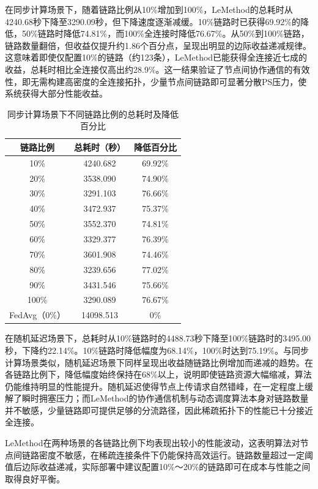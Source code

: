 \documentclass[master, vlined]{DissertUESTC}
\begin{document}
	在同步计算场景下，随着链路比例从10\%增加到100\%，LeMethod的总耗时从4240.68秒下降至3290.09秒，但下降速度逐渐减缓。10\%链路时已获得69.92\%的降低，50\%链路时降低74.81\%，而100\%全连接时降低76.67\%。从50\%到100\%链路，链路数量翻倍，但收益仅提升约1.86个百分点，呈现出明显的边际收益递减规律。这意味着即使仅配置10\%的链路（约123条），LeMethod已能获得全连接近七成的收益，总耗时相比全连接仅高出约28.9\%。这一结果验证了节点间协作通信的有效性，即无需构建高密度的全连接拓扑，少量节点间链路即可显著分散PS压力，使系统获得大部分性能收益。

	\begin{table}[!htb]
		\centering
		\caption{同步计算场景下不同链路比例的总耗时及降低百分比}
		\label{tab:sparse_sync}
		\begin{tabular}{|c|c|c|}
			\hline
			\textbf{链路比例} & \textbf{总耗时（秒）} & \textbf{降低百分比} \\
			\hline
			10\%  & 4240.682 & 69.92\% \\
			20\%  & 3538.090 & 74.90\% \\
			30\%  & 3291.103 & 76.66\% \\
			40\%  & 3472.937 & 75.37\% \\
			50\%  & 3552.370 & 74.81\% \\
			60\%  & 3329.377 & 76.39\% \\
			70\%  & 3601.908 & 74.46\% \\
			80\%  & 3239.656 & 77.02\% \\
			90\%  & 3431.546 & 75.66\% \\
			100\% & 3290.089 & 76.67\% \\
			\hline
			FedAvg（0\%）& 14098.513 & 0\% \\
			\hline
		\end{tabular}
	\end{table}

	在随机延迟场景下，总耗时从10\%链路时的4488.73秒下降至100\%链路时的3495.00秒，下降约22.14\%。10\%链路时降低幅度为68.14\%，100\%时达到75.19\%。与同步计算场景类似，随机延迟场景下同样呈现出收益随链路比例增加而递减的趋势。在各链路比例下，降低幅度始终保持在68\%以上，说明即使链路资源大幅缩减，算法仍能维持明显的性能提升。随机延迟使得节点上传请求自然错峰，在一定程度上缓解了瞬时拥塞压力；而LeMethod的协作通信机制与动态调度算法本身对链路数量并不敏感，少量链路即可提供足够的分流路径，因此稀疏拓扑下的性能已十分接近全连接。

	LeMethod在两种场景的各链路比例下均表现出较小的性能波动，这表明算法对节点间链路密度不敏感，在稀疏连接条件下仍能保持高效运行。链路数量超过一定阈值后边际收益递减，实际部署中建议配置10\%～20\%的链路即可在成本与性能之间取得良好平衡。
\end{document}
